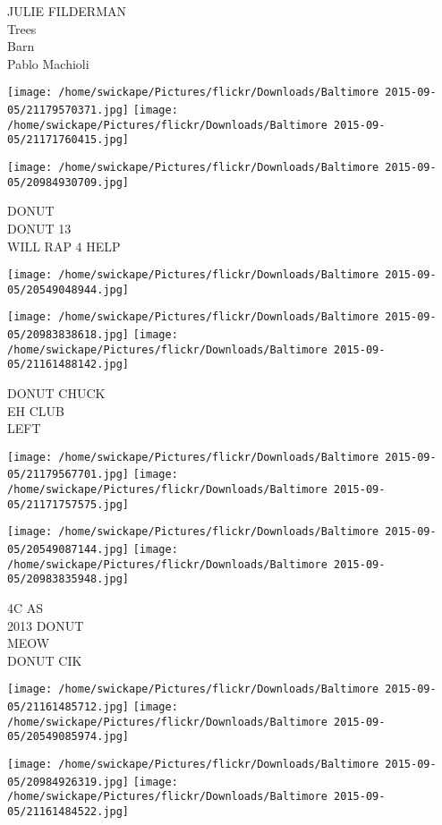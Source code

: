 \documentclass[10pt,letterpaper]{article}
\begin{document}
JULIE FILDERMAN\\
Trees\\
Barn\\
Pablo Machioli
\pagebreak

\texttt{[image: /home/swickape/Pictures/flickr/Downloads/Baltimore 2015-09-05/21179570371.jpg]}
\texttt{[image: /home/swickape/Pictures/flickr/Downloads/Baltimore 2015-09-05/21171760415.jpg]}

\texttt{[image: /home/swickape/Pictures/flickr/Downloads/Baltimore 2015-09-05/20984930709.jpg]}

DONUT\\
DONUT 13\\
WILL RAP 4 HELP
\pagebreak

\texttt{[image: /home/swickape/Pictures/flickr/Downloads/Baltimore 2015-09-05/20549048944.jpg]}

\vspace{0.25in}
\texttt{[image: /home/swickape/Pictures/flickr/Downloads/Baltimore 2015-09-05/20983838618.jpg]}
\texttt{[image: /home/swickape/Pictures/flickr/Downloads/Baltimore 2015-09-05/21161488142.jpg]}

DONUT CHUCK\\
EH CLUB\\
LEFT
\pagebreak

\texttt{[image: /home/swickape/Pictures/flickr/Downloads/Baltimore 2015-09-05/21179567701.jpg]}
\texttt{[image: /home/swickape/Pictures/flickr/Downloads/Baltimore 2015-09-05/21171757575.jpg]}

\texttt{[image: /home/swickape/Pictures/flickr/Downloads/Baltimore 2015-09-05/20549087144.jpg]}
\texttt{[image: /home/swickape/Pictures/flickr/Downloads/Baltimore 2015-09-05/20983835948.jpg]}

4C AS\\
2013 DONUT\\
MEOW\\
DONUT CIK
\pagebreak

\texttt{[image: /home/swickape/Pictures/flickr/Downloads/Baltimore 2015-09-05/21161485712.jpg]}
\texttt{[image: /home/swickape/Pictures/flickr/Downloads/Baltimore 2015-09-05/20549085974.jpg]}

\texttt{[image: /home/swickape/Pictures/flickr/Downloads/Baltimore 2015-09-05/20984926319.jpg]}
\texttt{[image: /home/swickape/Pictures/flickr/Downloads/Baltimore 2015-09-05/21161484522.jpg]}
\end{document}
